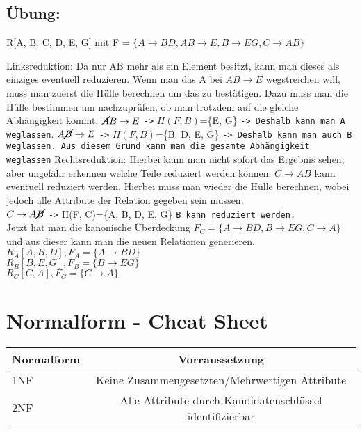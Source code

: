 \documentclass{article}
\begin{document}
	\subsection{Übung:}
	R[A, B, C, D, E, G] mit F = $\{A\to BD, AB\to E, B\to EG, C\to AB\}$

	Linksreduktion: Da nur AB mehr als ein Element besitzt, kann man dieses als einziges eventuell reduzieren.
	Wenn man das A bei $AB\to E$ wegstreichen will, muss man zuerst die Hülle berechnen um das zu bestätigen. Dazu muss man die Hülle bestimmen um nachzuprüfen, ob man trotzdem auf die gleiche Abhängigkeit kommt.
	$\cancel{A}B\to E$ \texttt{->} $H(F, B)$=\{E, G\} \texttt{-> Deshalb kann man A weglassen}.
	$A\cancel{B}\to E$ \texttt{->} $H(F, B)$=\{B. D, E, G\} \texttt{-> Deshalb kann man auch B weglassen. Aus diesem Grund kann man die gesamte Abhängigkeit weglassen}
	Rechtsreduktion: Hierbei kann man nicht sofort das Ergebnis sehen, aber ungefähr erkennen welche Teile reduziert werden können. $C\to AB$ kann eventuell reduziert werden. Hierbei muss man wieder die Hülle berechnen, wobei jedoch alle Attribute der Relation gegeben sein müssen. \\
	$C\to A\cancel{B}$ \texttt{->} H(F, C)=\{A, B, D, E, G\} \texttt{B kann reduziert werden.} \\
	Jetzt hat man die kanonische Überdeckung $F_C=\{A\to BD, B\to EG, C\to A\}$ und aus dieser kann man die neuen Relationen generieren.
	$R_A[A, B, D], F_A=\{A\to BD\}$ \\
	$R_B[B, E, G], F_B=\{B\to EG\}$ \\
	$R_C[C, A], F_C=\{C\to A\}$ \\
	\section{Normalform - Cheat Sheet}
	\begin{tabular}{| l | c |}
		\toprule
		Normalform & Vorraussetzung \\ \midrule
		1NF & Keine Zusammengesetzten/Mehrwertigen Attribute \\ \hline
		2NF & Alle Attribute durch Kandidatenschlüssel identifizierbar \\ \hline
		
		\bottomrule
	\end{tabular}
\end{document}
